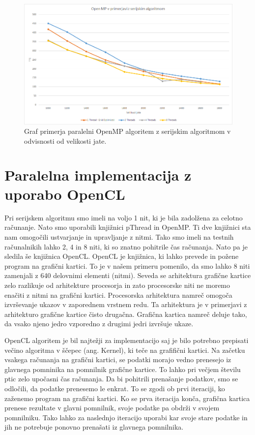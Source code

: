 \documentclass[a4paper, 12pt]{book}
\begin{document}
\begin{figure}[t]
\includegraphics[width=\textwidth]{graf_openmp}
\caption{Graf primerja paralelni OpenMP algoritem z serijskim algoritmom v odvisnosti od velikosti jate.}
\label{img:graf_openmp}
\centering
\end{figure}

\chapter{Paralelna implementacija z uporabo OpenCL}
\label{ch4}
Pri serijskem algoritmu smo imeli na voljo 1 nit, ki je bila zadolžena za celotno računanje. Nato smo uporabili knjižnici pThread in OpenMP. Ti dve knjižnici sta nam omogočili ustvarjanje in upravljanje z nitmi. Tako smo imeli na testnih računalnikih lahko 2, 4 in 8 niti, ki so znatno pohitrile čas računanja. Nato pa je sledila še knjižnica OpenCL. OpenCL je knjižnica, ki lahko prevede in požene program na grafični kartici. To je v našem primeru pomenilo, da smo lahko 8 niti zamenjali z 640 delovnimi elementi (nitmi). Seveda se arhitektura grafične kartice zelo razlikuje od arhitekture procesorja in zato procesorske niti ne moremo enačiti z nitmi na grafični kartici. Procesorska arhitektura namreč omogoča izvrševanje ukazov v zaporednem vrstnem redu. Ta arhitektura je v primerjavi z arhitekturo grafične kartice čisto drugačna. Grafična kartica namreč deluje tako, da vsako njeno jedro vzporedno z drugimi jedri izvršuje ukaze. 

OpenCL algoritem je bil najtežji za implementacijo saj je bilo potrebno prepisati večino algoritma v ščepec (ang. Kernel), ki teče na grafifični kartici. Na začetku vsakega računanja na grafični kartici, se podatki morajo vedno prenesejo iz glavnega pomninika na pomnilnik grafične kartice. To lahko pri večjem številu ptic zelo upočasni čas računanja. Da bi pohitrili prenašanje podatkov, smo se odločili, da podatke prenesemo le enkrat. To se zgodi ob prvi iteraciji, ko zaženemo program na grafični kartici. Ko se prva iteracija konča, grafična kartica prenese rezultate v glavni pomnilnik, svoje podatke pa obdrži v svojem pomnilniku. Tako lahko za naslednjo iteracijo uporabi kar svoje stare podatke in jih ne potrebuje ponovno prenašati iz glavnega pomnilnika.
\end{document}

